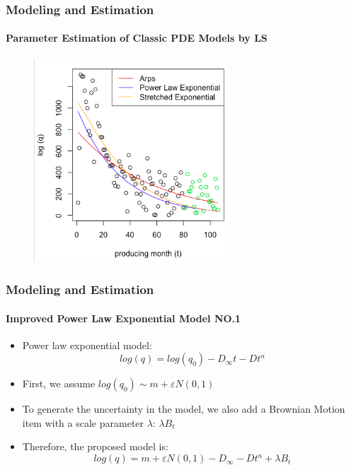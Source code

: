 \documentclass[11pt]{beamer}
\begin{document}
	\begin{frame}
		\frametitle{Modeling and Estimation}
		\framesubtitle{Parameter Estimation of Classic PDE Models by LS}
	\begin{figure}
\begin{center}
\includegraphics[width=0.65\textwidth  ]{arps} 

\end{center}
\end{figure}	
	\end{frame}		
				
	\begin{frame}
		\frametitle{Modeling and Estimation}
		\framesubtitle{Improved Power Law Exponential Model NO.1}
		\justifying
		\begin{itemize}
		\item Power law exponential model:
		\begin{equation}
		log(q)=log(q_0)-D_\infty t - Dt^n
		\end{equation}
		\item First, we assume $log(q_0)\sim m+\varepsilon N(0,1)$
		\item To generate the uncertainty in the model, we also add a Brownian Motion item with a scale parameter $\lambda$:
		$\lambda B_t$
		\item Therefore, the proposed model is:
		\begin{equation}
		log(q)=m+\varepsilon N(0,1)-D_\infty - Dt^n+\lambda B_t
		\end{equation}
		\end{itemize}		
			\end{frame}		
\end{document}
